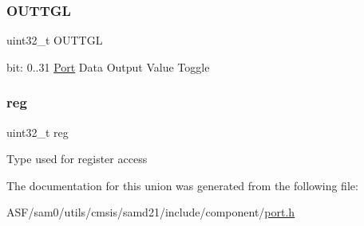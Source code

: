 \subsubsection{\texorpdfstring{OUTTGL}{OUTTGL}}
{\footnotesize\ttfamily uint32\+\_\+t O\+U\+T\+T\+GL}

bit\+: 0..31 \mbox{\hyperlink{struct_port}{Port}} Data Output Value Toggle \mbox{\label{union_p_o_r_t___o_u_t_t_g_l___type_a6b91636401516a477989a336376d7b40}} 
\subsubsection{\texorpdfstring{reg}{reg}}
{\footnotesize\ttfamily uint32\+\_\+t reg}

Type used for register access 

The documentation for this union was generated from the following file\+:\begin{DoxyCompactItemize}
\item 
A\+S\+F/sam0/utils/cmsis/samd21/include/component/\mbox{\hyperlink{utils_2cmsis_2samd21_2include_2component_2port_8h}{port.\+h}}\end{DoxyCompactItemize}
